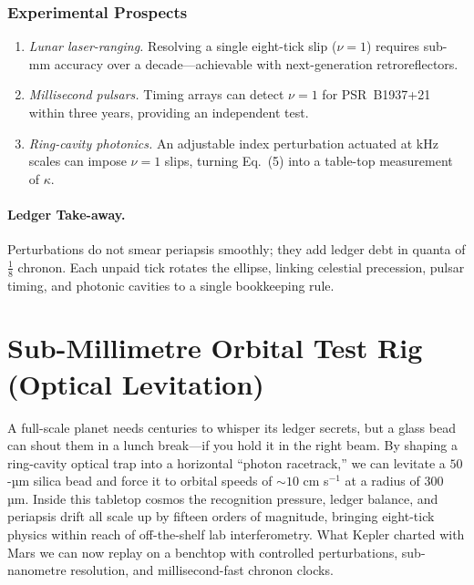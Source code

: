 \documentclass[11pt,oneside]{book}
\begin{document}
\subsubsection{Experimental Prospects}
\label{ss:periapsis-experiments}

\begin{enumerate}[label=\arabic*.,leftmargin=*,itemsep=3pt]
\item \emph{Lunar laser-ranging.}  
      Resolving a single eight-tick slip ($\nu=1$) requires sub-mm
      accuracy over a decade—achievable with next-generation retroreflectors.
\item \emph{Millisecond pulsars.}  
      Timing arrays can detect $\nu=1$ for
      PSR~B1937+21 within three years, providing an independent test.
\item \emph{Ring-cavity photonics.}  
      An adjustable index perturbation actuated at kHz scales can
      impose $\nu=1$ slips, turning Eq.~(5) into a table-top
      measurement of $\kappa$.
\end{enumerate}

\paragraph{Ledger Take-away.}
Perturbations do not smear periapsis smoothly; they add ledger debt in
quanta of $\tfrac{1}{8}$ chronon.  Each unpaid tick rotates the ellipse,
linking celestial precession, pulsar timing, and photonic cavities to a
single bookkeeping rule.


\section{Sub-Millimetre Orbital Test Rig (Optical Levitation)}
\label{sec:submm-orbital-rig}

A full-scale planet needs centuries to whisper its ledger secrets, but
a glass bead can shout them in a lunch break—if you hold it in the
right beam.  
By shaping a ring-cavity optical trap into a horizontal ``photon
racetrack,'' we can levitate a $50$-µm silica bead and force it to
orbital speeds of $\sim10$ cm s$^{-1}$ at a radius of
$300$ µm.  
Inside this tabletop cosmos the recognition pressure, ledger balance,
and periapsis drift all scale up by fifteen orders of magnitude,
bringing eight-tick physics within reach of off-the-shelf lab
interferometry.  
What Kepler charted with Mars we can now replay on a benchtop with
controlled perturbations, sub-nanometre resolution, and
millisecond-fast chronon clocks.
\end{document}
